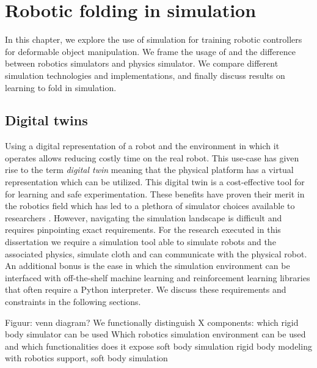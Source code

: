 \documentclass[\home/main.tex]{subfiles}
\begin{document}
\graphicspath{{\home/figures}}

\chapter{Robotic folding in simulation}\label{ch:simulation}


In this chapter, we explore the use of simulation for training robotic controllers for deformable object manipulation. We frame the usage of and the difference between robotics simulators and physics simulator. We compare different simulation technologies and implementations, and finally discuss results on learning to fold in simulation. 

\section{Digital twins}

Using a digital representation of a robot and the environment in which it operates allows reducing costly time on the real robot. This use-case has given rise to the term \emph{digital twin} meaning that the physical platform has a virtual representation which can be utilized. This digital twin is a cost-effective tool for for learning and safe experimentation. These benefits have proven their merit in the robotics field which has led to a plethora of simulator choices available to researchers \autocite{Collins2021}. However, navigating the simulation landscape is difficult and requires pinpointing exact requirements. For the research executed in this dissertation we require a simulation tool able to simulate robots and the associated physics, simulate cloth and can communicate with the physical robot. An additional bonus is the ease in which the simulation environment can be interfaced with off-the-shelf machine learning and reinforcement learning libraries that often require a Python interpreter. 
We discuss these requirements and constraints in the following sections. 

Figuur: venn diagram? 
We functionally distinguish X components: 
    which rigid body simulator can be used
    Which robotics simulation environment can be used and which functionalities does it expose 
    soft body simulation 
rigid body modeling with robotics support, soft body simulation
\end{document}
